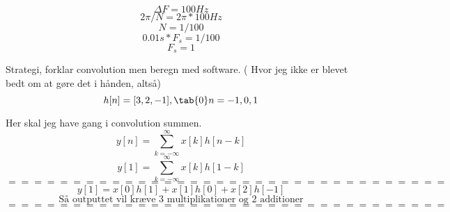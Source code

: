 \begin{rubrik}
\begin{eksamensOpgave}
\begin{UnderOpgave}
            \[\Delta F = 100Hz\]
            \[2\pi/N = 2\pi * 100Hz\]
            \[N = 1/100\]
            \[0.01s * F_s = 1/100\]
            \[F_s = 1\]







        \end{UnderOpgave}
        
    \end{eksamensOpgave}
\end{rubrik}\setcounter{eksamensOpgave}{0}

\begin{rubrik}
    \begin{eksamensOpgave}
        Strategi, forklar convolution men beregn med software. ( Hvor jeg ikke er blevet bedt om at gøre det i hånden, altså)
        \[h[n] = [3, 2, -1], \tab{0} n = -1, 0, 1\]
        \begin{UnderOpgave}
            Her skal jeg have gang i convolution summen. 
            \[y[n] = \sum_{k = -\infty}^{\infty}{x[k]h[n - k]}\]
            \[y[1] = \sum_{k = -\infty}^{\infty}{x[k]h[1 - k]}\]
            \[==================================\]
            \[y[1] = x[0]h[1] + x[1]h[0] + x[2]h[-1]\]
            \[\text{Så outputtet vil kræve 3 multiplikationer og 2 additioner}\]
            \[==================================\]


\end{UnderOpgave}
\end{eksamensOpgave}
\end{rubrik}
